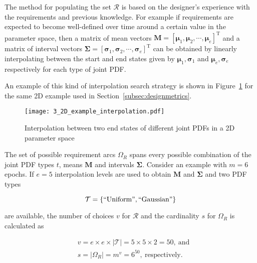 The method for populating the set $\mathcal{R}$ is based on the designer's experience with the requirements and previous knowledge. For example if requirements are expected to become well-defined over time around a certain value in the parameter space, then a matrix of mean vectors $\mathbf{M} = \left[\boldsymbol{\mu}_1,\boldsymbol{\mu}_2,\cdots,\boldsymbol{\mu}_e\right]^{\textrm{T}}$ and a matrix of interval vectors $\boldsymbol{\Sigma} = \left[\boldsymbol{\sigma}_1,\boldsymbol{\sigma}_2,\cdots,\boldsymbol{\sigma}_e\right]^{\textrm{T}}$ can be obtained by linearly interpolating between the start and end states given by $\boldsymbol{\mu}_1,\boldsymbol{\sigma}_1$ and $\boldsymbol{\mu}_e,\boldsymbol{\sigma}_e$ respectively for each type of joint \ac{PDF}. 

An example of this kind of interpolation search strategy is shown in Figure~\ref{fig:2Dexampleinterp} for the same 2D example used in Section~\ref{subsec:designmetrics}.

\begin{figure}[h!]
	\centering
	\texttt{[image: 3\_2D\_example\_interpolation.pdf]}
	\caption{Interpolation between two end states of different joint \acp{PDF} in a 2D parameter space}
	\label{fig:2Dexampleinterp}
\end{figure}

The set of possible requirement arcs $\Omega_R$ spans every possible combination of the joint \ac{PDF} types $t$, means $\mathbf{M}$ and intervals $\boldsymbol{\Sigma}$. Consider an example with $m=6$ epochs. If $e=5$ interpolation levels are used to obtain $\mathbf{M}$ and $\boldsymbol{\Sigma}$ and two \ac{PDF} types 

\begin{equation*}
	\mathcal{T} = \left\{\mathrm{``Uniform"},\mathrm{``Gaussian"}\right\}
\end{equation*} 

are available, the number of choices $v$ for $\mathcal{R}$ and the cardinality $s$ for $\Omega_R$ is calculated as

\begin{equation*}
	\begin{aligned}
		& v = e \times e \times |\mathcal{T}| = 5 \times 5 \times 2 = 50,~\textrm{and}\\
		& s = |\Omega_R| = m^v = 6^{50},~\mathrm{respectively}.\\
	\end{aligned}
\end{equation*}

